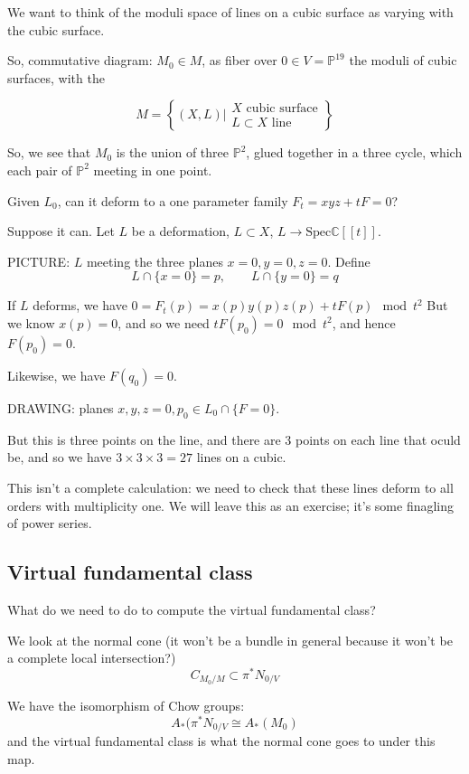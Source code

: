 \documentclass{amsart}
\theoremstyle{definition}
\newcommand{\proj}{\mathbb{P}}
\newcommand{\C}{\mathbb{C}}
\begin{document}
We want to think of the moduli space of lines on a cubic surface as varying with the cubic surface.

So, commutative diagram: $M_0\in M$, as fiber over $0\in V=\proj^{19}$ the moduli of cubic surfaces, with the 

$$M=\left\{ (X,L)\Bigg|\begin{array}{l} X \text{ cubic surface} \\ L\subset X \text{ line} 
\end{array}\right\}$$

So, we see that $M_0$ is the union of three $\proj^2$, glued together in a three cycle, which each pair of $\proj^2$ meeting in one point.


Given $L_0$, can it deform to a one parameter family $F_t=xyz+tF=0$?  



Suppose it can.  Let $L$ be a deformation, $L\subset X$, $L\to\text{Spec} \C[[t]]$.

PICTURE: $L$ meeting the three planes $x=0,y=0,z=0$.
Define
$$L\cap \{x=0\}=p, \quad \quad L\cap\{y=0\}=q$$

If $L$ deforms, we have $0=F_t(p)=x(p)y(p)z(p)+tF(p)\mod t^2$
But we know $x(p)=0$, and so we need
$tF(p_0)=0\mod t^2$, and hence $F(p_0)=0$.

Likewise, we have $F(q_0)=0$.

DRAWING: planes $x,y,z=0, p_0\in L_0\cap \{F=0\}$.

But this is three points on the line, and there are 3 points on each line that oculd be, and so we have $3\times 3\times 3=27$ lines on a cubic.


This isn't a complete calculation: we need to check that these lines deform to all orders with multiplicity one.  We will leave this as an exercise; it's some finagling of power series.

\subsection{Virtual fundamental class}

What do we need to do to compute the virtual fundamental class?

We look at the normal cone (it won't be a bundle in general because it won't be a complete local intersection?) $$C_{M_0/M}\subset\pi^* N_{0/V}$$

We have the isomorphism of Chow groups:
$$A_*(\pi^* N_{0/V}\cong A_*(M_0)$$
and the virtual fundamental class is what the normal cone goes to under this map.
\end{document}
